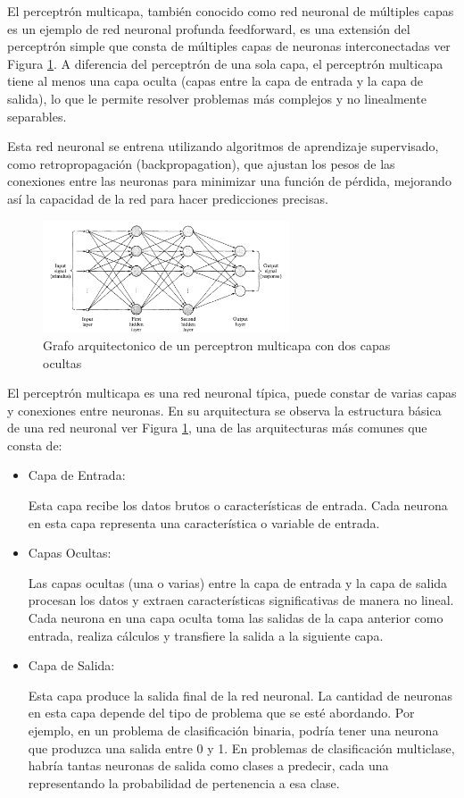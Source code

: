 El perceptrón multicapa, también conocido como red neuronal de múltiples capas es un ejemplo de red neuronal profunda feedforward, es una extensión del perceptrón simple que consta de múltiples capas de neuronas interconectadas ver Figura \ref{fig:an7}. A diferencia del perceptrón de una sola capa, el perceptrón multicapa tiene al menos una capa oculta (capas entre la capa de entrada y la capa de salida), lo que le permite resolver problemas más complejos y no linealmente separables.

Esta red neuronal se entrena utilizando algoritmos de aprendizaje supervisado, como retropropagación (backpropagation), que ajustan los pesos de las conexiones entre las neuronas para minimizar una función de pérdida, mejorando así la capacidad de la red para hacer predicciones precisas.

\begin{figure}
	\includegraphics[width=0.65\textwidth]{capitulo2/figuras/an7.png}
	\caption{Grafo arquitectonico de un perceptron multicapa con dos capas ocultas}
	\label{fig:an7}
\end{figure}

El perceptrón multicapa es una red neuronal típica, puede constar de varias capas y conexiones entre neuronas. En su arquitectura se observa la estructura básica de una red neuronal ver Figura \ref{fig:an7}, una de las arquitecturas más comunes que consta de: 
\begin{itemize}

	\item Capa de Entrada: 
	
	Esta capa recibe los datos brutos o características de entrada. Cada neurona en esta capa representa una característica o variable de entrada.

	\item Capas Ocultas: 
	
	Las capas ocultas (una o varias) entre la capa de entrada y la capa de salida procesan los datos y extraen características significativas de manera no lineal. Cada neurona en una capa oculta toma las salidas de la capa anterior como entrada, realiza cálculos y transfiere la salida a la siguiente capa.

	\item Capa de Salida:
	
	Esta capa produce la salida final de la red neuronal. La cantidad de neuronas en esta capa depende del tipo de problema que se esté abordando. Por ejemplo, en un problema de clasificación binaria, podría tener una neurona que produzca una salida entre 0 y 1. En problemas de clasificación multiclase, habría tantas neuronas de salida como clases a predecir, cada una representando la probabilidad de pertenencia a esa clase.
\end{itemize}